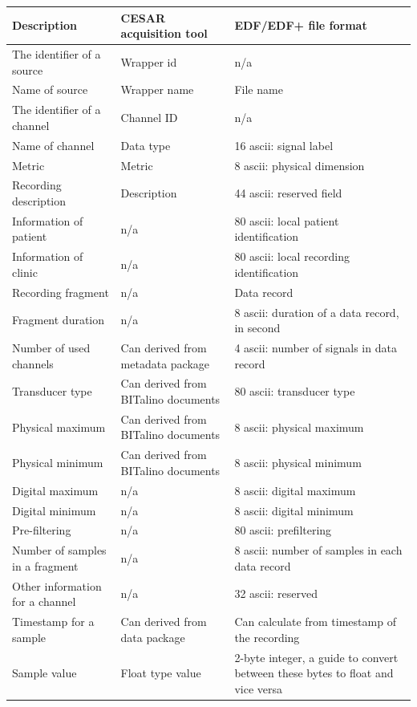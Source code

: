\begin{table}
\small
\begin{center}
\begin{tabular}{ |p{5cm}||p{4.5cm}|p{5.5cm}|  }
 \hline
 Description& CESAR acquisition tool & EDF/EDF+ file format \\
 \hline
 The identifier of a source& Wrapper id& n/a\\
 \hline
 Name of source& Wrapper name& File name\\
 \hline
 The identifier of a channel& Channel ID& n/a\\
 \hline
 Name of channel& Data type& 16 ascii: signal label\\
 \hline
 Metric& Metric& 8 ascii: physical dimension\\
 \hline
 Recording description& Description& 44 ascii: reserved field\\
 \hline
 Information of patient& n/a& 80 ascii: local patient identification\\
 \hline
 Information of clinic& n/a& 80 ascii: local recording identification\\
 \hline
 Recording fragment& n/a& Data record\\
 \hline
 Fragment duration& n/a& 8 ascii: duration of a data record, in second\\
 \hline
 Number of used channels& Can derived from metadata package& 4 ascii: number of signals in data record\\
 \hline
 Transducer type& Can derived from BITalino documents& 80 ascii: transducer type\\
 \hline
 Physical maximum& Can derived from BITalino documents& 8 ascii: physical maximum\\
 \hline
 Physical minimum& Can derived from BITalino documents& 8 ascii: physical minimum\\
 \hline
 Digital maximum& n/a& 8 ascii: digital maximum\\
 \hline
 Digital minimum& n/a& 8 ascii: digital minimum\\
 \hline
 Pre-filtering& n/a& 80 ascii: prefiltering\\
 \hline
 Number of samples in a fragment& n/a& 8 ascii: number of samples in each data record\\
 \hline
 Other information for a channel& n/a& 32 ascii: reserved\\
 \hline
 Timestamp for a sample& Can derived from data package& Can calculate from timestamp of the recording\\
 \hline
 Sample value& Float type value& 2-byte integer, a guide to convert between these bytes to float and vice versa\\

\end{tabular}
\end{center}
\end{table}
